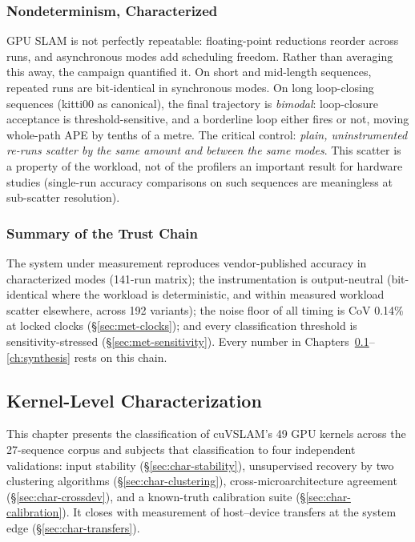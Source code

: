 \subsubsection{Nondeterminism, Characterized}
\label{sec:val-nondeterminism}

GPU SLAM is not perfectly repeatable: floating-point reductions reorder across runs, and asynchronous modes add scheduling freedom. Rather than averaging this away, the campaign quantified it. On short and mid-length sequences, repeated runs are bit-identical in synchronous modes. On long loop-closing sequences (kitti00 as canonical), the final trajectory is \emph{bimodal}: loop-closure acceptance is threshold-sensitive, and a borderline loop either fires or not, moving whole-path APE by tenths of a metre. The critical control: \emph{plain, uninstrumented re-runs scatter by the same amount and between the same modes}. This scatter is a property of the workload, not of the profilers an important result for hardware studies (single-run accuracy comparisons on such sequences are meaningless at sub-scatter resolution).

\subsubsection{Summary of the Trust Chain}

The system under measurement reproduces vendor-published accuracy in characterized modes (141-run matrix); the instrumentation is output-neutral (bit-identical where the workload is deterministic, and within measured workload scatter elsewhere, across 192 variants); the noise floor of all timing is CoV 0.14\% at locked clocks (\S\ref{sec:met-clocks}); and every classification threshold is sensitivity-stressed (\S\ref{sec:met-sensitivity}). Every number in Chapters~\ref{ch:characterization}--\ref{ch:synthesis} rests on this chain.

\subsection{Kernel-Level Characterization}
\label{ch:characterization}

This chapter presents the classification of cuVSLAM's 49 GPU kernels across the 27-sequence corpus and subjects that classification to four independent validations: input stability (\S\ref{sec:char-stability}), unsupervised recovery by two clustering algorithms (\S\ref{sec:char-clustering}), cross-microarchitecture agreement (\S\ref{sec:char-crossdev}), and a known-truth calibration suite (\S\ref{sec:char-calibration}). It closes with measurement of host--device transfers at the system edge (\S\ref{sec:char-transfers}).

